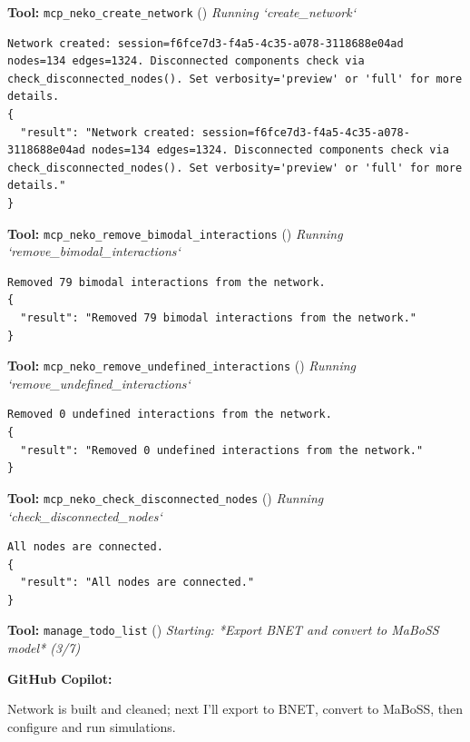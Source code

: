 \documentclass[11pt,a4paper]{article}
\begin{document}
\begin{toolokbox}
\textbf{Tool:} \texttt{mcp\_neko\_create\_network} (\checkmark)
\textit{Running `create\_network`}
\begin{lstlisting}
Network created: session=f6fce7d3-f4a5-4c35-a078-3118688e04ad nodes=134 edges=1324. Disconnected components check via check_disconnected_nodes(). Set verbosity='preview' or 'full' for more details.
{
  "result": "Network created: session=f6fce7d3-f4a5-4c35-a078-3118688e04ad nodes=134 edges=1324. Disconnected components check via check_disconnected_nodes(). Set verbosity='preview' or 'full' for more details."
}
\end{lstlisting}
\end{toolokbox}
\begin{toolokbox}
\textbf{Tool:} \texttt{mcp\_neko\_remove\_bimodal\_interactions} (\checkmark)
\textit{Running `remove\_bimodal\_interactions`}
\begin{lstlisting}
Removed 79 bimodal interactions from the network.
{
  "result": "Removed 79 bimodal interactions from the network."
}
\end{lstlisting}
\end{toolokbox}
\begin{toolokbox}
\textbf{Tool:} \texttt{mcp\_neko\_remove\_undefined\_interactions} (\checkmark)
\textit{Running `remove\_undefined\_interactions`}
\begin{lstlisting}
Removed 0 undefined interactions from the network.
{
  "result": "Removed 0 undefined interactions from the network."
}
\end{lstlisting}
\end{toolokbox}
\begin{toolokbox}
\textbf{Tool:} \texttt{mcp\_neko\_check\_disconnected\_nodes} (\checkmark)
\textit{Running `check\_disconnected\_nodes`}
\begin{lstlisting}
All nodes are connected.
{
  "result": "All nodes are connected."
}
\end{lstlisting}
\end{toolokbox}
\begin{toolokbox}
\textbf{Tool:} \texttt{manage\_todo\_list} (\checkmark)
\textit{Starting: *Export BNET and convert to MaBoSS model* (3/7)}
\end{toolokbox}
\begin{copilotbox}
\textbf{GitHub Copilot:}

Network is built and cleaned; next I’ll export to BNET, convert to MaBoSS, then configure and run simulations.

\end{copilotbox}
\end{document}
